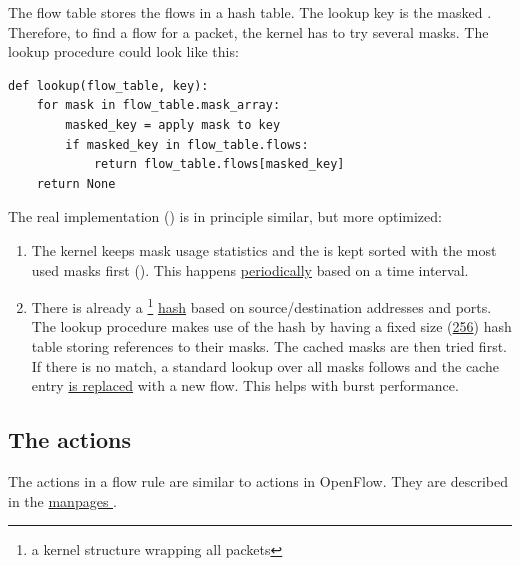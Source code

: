 The flow table stores the flows in a hash table. The lookup key is the masked . Therefore, to find a flow for a packet, the kernel has to try several masks. The lookup procedure could look like this:

\begin{verbatim}
def lookup(flow_table, key):
    for mask in flow_table.mask_array:
        masked_key = apply mask to key
        if masked_key in flow_table.flows:
            return flow_table.flows[masked_key]
    return None
\end{verbatim}
    

The real implementation (\href{https://elixir.bootlin.com/linux/v6.2.5/source/net/openvswitch/flow_table.c\#L785}{}) is in principle similar, but more optimized:

\begin{enumerate}
\def\labelenumi{\arabic{enumi}.}
\item
  The kernel keeps mask usage statistics and the  is
  kept sorted with the most used masks first
  (\href{https://elixir.bootlin.com/linux/v6.2.5/source/net/openvswitch/flow_table.c\#L1107}{}).
  This happens
  \href{https://elixir.bootlin.com/linux/v6.2.5/source/net/openvswitch/datapath.c\#L2536}{periodically}
  based on a time interval.
\item
  There is already a \footnote{a kernel structure wrapping all packets}
  \href{https://elixir.bootlin.com/linux/v6.2.5/source/include/linux/skbuff.h\#L1537}{hash}
  based on source/destination addresses and ports. The lookup procedure
  makes use of the hash by having a fixed size
  (\href{https://elixir.bootlin.com/linux/v6.2.5/source/net/openvswitch/flow_table.c\#L41}{256})
  hash table storing references to their masks. The cached masks are
  then tried first. If there is no match, a standard lookup over all masks
  follows and the cache entry \href{https://elixir.bootlin.com/linux/v6.2.5/source/net/openvswitch/flow_table.c\#L842}{is replaced} with a new flow. This helps with burst performance.
\end{enumerate}

\subsection{The actions}
\label{subsec:ovs-actions}

The actions in a flow rule are similar to actions in OpenFlow. They are described in the \href{https://www.man7.org/linux/man-pages/man7/ovs-actions.7.html}{manpages }.

